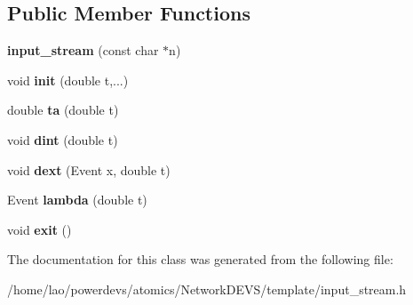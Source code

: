 \subsection*{Public Member Functions}
\begin{DoxyCompactItemize}
\item 
{\bfseries input\+\_\+stream} (const char $\ast$n)\hypertarget{classinput__stream_ac5075c6ed0a87da7a096fd44cbc4d113}{}\label{classinput__stream_ac5075c6ed0a87da7a096fd44cbc4d113}

\item 
void {\bfseries init} (double t,...)\hypertarget{classinput__stream_a7080ba1b96056747cbd0f836b692e319}{}\label{classinput__stream_a7080ba1b96056747cbd0f836b692e319}

\item 
double {\bfseries ta} (double t)\hypertarget{classinput__stream_a2646cf888bb02ff289b99c473420c474}{}\label{classinput__stream_a2646cf888bb02ff289b99c473420c474}

\item 
void {\bfseries dint} (double t)\hypertarget{classinput__stream_a6587dc4c03edab458b160fa9e0fc26a9}{}\label{classinput__stream_a6587dc4c03edab458b160fa9e0fc26a9}

\item 
void {\bfseries dext} (Event x, double t)\hypertarget{classinput__stream_add1e66ac8a04594931a57387681e6131}{}\label{classinput__stream_add1e66ac8a04594931a57387681e6131}

\item 
Event {\bfseries lambda} (double t)\hypertarget{classinput__stream_ac4ba4f32f1d91c8790b087c3020a4ccf}{}\label{classinput__stream_ac4ba4f32f1d91c8790b087c3020a4ccf}

\item 
void {\bfseries exit} ()\hypertarget{classinput__stream_a74fc7095691b7da697d8008ea783ae23}{}\label{classinput__stream_a74fc7095691b7da697d8008ea783ae23}

\end{DoxyCompactItemize}


The documentation for this class was generated from the following file\+:\begin{DoxyCompactItemize}
\item 
/home/lao/powerdevs/atomics/\+Network\+D\+E\+V\+S/template/input\+\_\+stream.\+h\end{DoxyCompactItemize}
